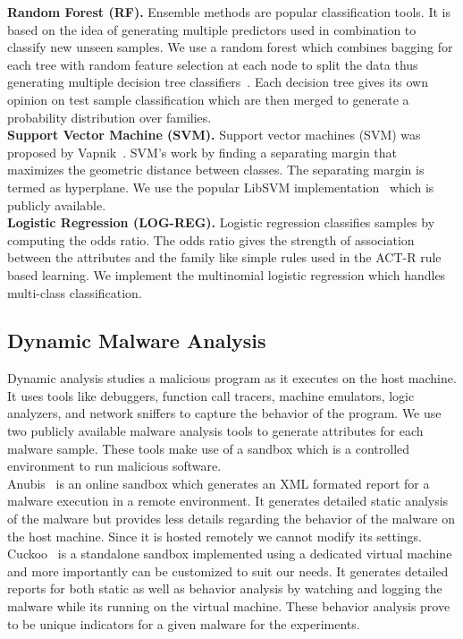 \documentclass[conference]{IEEEtran}
\begin{document}
\noindent\textbf{Random Forest (RF).}  Ensemble methods are popular classification tools. It is based on the idea of generating multiple predictors used in combination to classify new unseen samples. We use a random forest which combines bagging for each tree with random feature selection at each node to split the data thus generating multiple decision tree classifiers~\cite{Breiman01}. Each decision tree gives its own opinion on test sample classification which are then merged to generate a probability distribution over families.\smallskip\\
\noindent\textbf{Support Vector Machine (SVM).}  Support vector machines (SVM) was proposed by Vapnik~\cite{Cortes95support-vectornetworks}. SVM's work by finding a separating margin that maximizes the geometric distance between classes. The separating margin is termed as hyperplane. We use the popular LibSVM implementation~\cite{Chang2011} which is publicly available.\smallskip\\
\noindent\textbf{Logistic Regression (LOG-REG).}  Logistic regression classifies samples by computing the odds ratio. The odds ratio gives the strength of association between the attributes and the family like simple rules used in the ACT-R rule based learning. We implement the multinomial logistic regression which handles multi-class classification.

\subsection{Dynamic Malware Analysis}
\label{sandbox}
Dynamic analysis studies a malicious program as it executes on the host machine. It uses tools like debuggers, function call tracers, machine emulators, logic analyzers, and network sniffers to capture the behavior of the program. 
We use two publicly available malware analysis tools to generate attributes for each malware sample. These tools make use of a sandbox which is a controlled environment to run malicious software.\smallskip\\
  Anubis~\cite{anubis} is an online sandbox which generates an XML formated report for a malware execution in a remote environment. It generates detailed static analysis of the malware but provides less details regarding the behavior of the malware on the host machine. Since it is hosted remotely we cannot modify its settings.\smallskip\\
  Cuckoo~\cite{cuckoo} is a standalone sandbox implemented using a dedicated virtual machine and more importantly can be customized to suit our needs. It generates detailed reports for both static as well as behavior analysis by watching and logging the malware while its running on the virtual machine. These behavior analysis prove to be unique indicators for a given malware for the experiments. 
\end{document}
